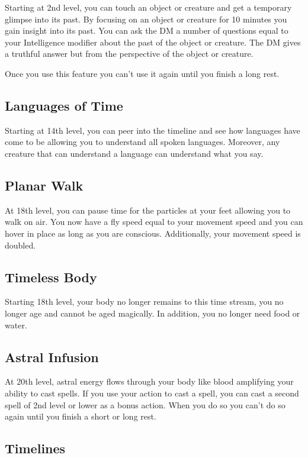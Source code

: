 Starting at 2nd level, you can touch an object or creature and get a temporary glimpse into its past. By focusing on an object or creature for 10 minutes you gain insight into its past. You can ask the DM a number of questions equal to your Intelligence modifier about the past of the object or creature. The DM gives a truthful answer but from the perspective of the object or creature.

Once you use this feature you can't use it again until you finish a long rest.

\subsection{Languages of Time}

Starting at 14th level, you can peer into the timeline and see how languages have come to be allowing you to understand all spoken languages. Moreover, any creature that can understand a language can understand what you say.

\subsection{Planar Walk}

At 18th level, you can pause time for the particles at your feet allowing you to walk on air. You now have a fly speed equal to your movement speed and you can hover in place as long as you are conscious. Additionally, your movement speed is doubled.

\subsection{Timeless Body}

Starting 18th level, your body no longer remains to this time stream, you no longer age and cannot be aged magically. In addition, you no longer need food or water.

\subsection{Astral Infusion}

At 20th level, astral energy flows through your body like blood amplifying your ability to cast spells. If you use your action to cast a spell, you can cast a second spell of 2nd level or lower as a bonus action. When you do so you can't do so again until you finish a short or long rest.

\subsection{Timelines}

